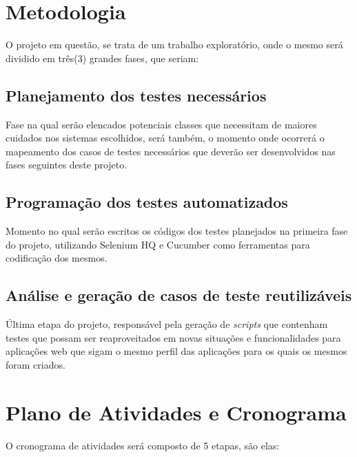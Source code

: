 \documentclass[12pt]{article}
\begin{document}
	\section{Metodologia}

	O projeto em questão, se trata de um trabalho exploratório, onde o mesmo será dividido em três(3) grandes fases, que seriam:

	\subsection{Planejamento dos testes necessários}
	Fase na qual serão elencados potenciais classes que necessitam de maiores cuidados nos sistemas escolhidos, será também, o momento onde ocorrerá o mapeamento dos casos de testes necessários que deverão ser
	desenvolvidos nas fases seguintes deste projeto.

	\subsection{Programação dos testes automatizados}
	Momento no qual serão escritos os códigos dos testes planejados na primeira fase do projeto, utilizando Selenium HQ e Cucumber como ferramentas para codificação dos mesmos.

    \subsection{Análise e geração de casos de teste reutilizáveis}
    Última etapa do projeto, responsável pela geração de \emph{scripts} que contenham testes que possam ser reaproveitados em novas situações e funcionalidades para aplicações web que sigam o mesmo perfil das
    aplicações para os quais os mesmos foram criados.

	\section{Plano de Atividades e Cronograma}

	O cronograma de atividades será composto de 5 etapas, são elas:
	
\end{document}
